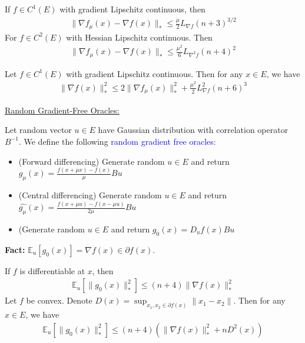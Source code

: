 \documentclass{article}
\begin{document}
\begin{lemma}
If $f \in C^1(E)$ with gradient Lipschitz continuous, then 
\begin{align}
    \| \nabla f_{\mu}(x) - \nabla f(x)\|_* \leq \frac{\mu}{2}L_{\nabla f}(n+3)^{3/2}
\end{align}
For $f \in C^2(E)$ with Hessian Lipschitz continuous. Then
\begin{align}
    \| \nabla f_{\mu}(x) - \nabla f(x)\|_* \leq \frac{\mu^2}{6}L_{\nabla^2 f}(n+4)^2
\end{align}
\end{lemma}

\begin{lemma}
Let $f \in C^1(E)$ with gradient Lipschitz continuous. Then for any $x \in E$, we have 
\begin{align}
    \| \nabla f(x)\|_*^2 \leq 2\|\nabla f_{\mu}(x)\|_*^2 + \frac{\mu^2}{2}L_{\nabla f}^2(n+6)^3
\end{align}
\end{lemma}

\underline{Random Gradient-Free Oracles:} \newline 

Let random vector $u \in E$ have Gaussian distribution with correlation operator $B^{-1}$. We define the following \textcolor{blue}{random gradient free oracles}:

\begin{itemize}
    \item (Forward differencing) Generate random $u \in E$ and return $g_{\mu}(x) = \frac{f(x+\mu x) - f(x)}{\mu}Bu$
    \item (Central differencing) Generate random $u \in E$ and return $\hat{g_{\mu}}(x) = \frac{f(x+\mu u) - f(x-\mu u)}{2\mu}Bu$
    \item (Generate random $u \in E$ and return $g_0(x) = D_uf(x)Bu$
\end{itemize}

\textbf{Fact:} $\mathbb{E}_u[g_0(x)] = \nabla f(x) \in \partial f(x)$.  

\begin{theorem}
If $f$ is differentiable at $x$, then
\begin{align}
    \mathbb{E}_u[\| g_0(x)\|_*^2] \leq (n+4)\|\nabla f(x)\|_*^2
\end{align}
Let $f$ be convex. Denote $D(x) = \sup_{x_1,x_2 \in \partial f(x)}\|x_1-x_2\|$. Then for any $x \in E$, we have 
\begin{align}
    \mathbb{E}_u[\|g_0(x)\|_*^2] \leq (n+4)(\|\nabla f(x)\|_*^2 + nD^2(x))
\end{align}
\end{theorem}
\end{document}
